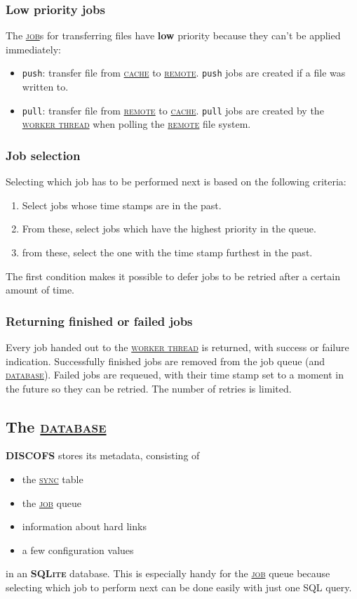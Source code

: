 \documentclass[a4paper]{article}
\newcommand{\software}[1]{\textsc{\textbf{#1}}\xspace}
\newcommand{\discofs}{\software{DISCOFS}}
\newcommand{\sqlite}{\software{SQLite}}
\newcommand{\component}[1]{\hyperref[comp:#1]{\textsc{#1}}\xspace}
\newcommand{\job}{\component{job}}
\newcommand{\jobs}{\job{}s\xspace}
\newcommand{\jobtype}[1]{\texttt{#1}\xspace}
\newcommand{\push}{\jobtype{push}}
\newcommand{\pull}{\jobtype{pull}}
\newcommand{\sync}{\component{sync}}
\newcommand{\cache}{\component{cache}}
\newcommand{\remote}{\component{remote}}
\newcommand{\database}{\component{database}}
\newcommand{\workerthread}{\hyperref[comp:workerthread]{\textsc{worker thread}}\xspace}
\begin{document}
\subsubsection{Low priority jobs}
The \jobs for transferring files have \textbf{low} priority because they can't be applied
immediately:
\begin{itemize}
	\item \push: transfer file from \cache to \remote. \push jobs are created if a
			file was written to.
	\item \pull: transfer file from \remote to \cache. \pull jobs are created by
			the \workerthread when polling the \remote file system.
\end{itemize}


\subsubsection{Job selection}
Selecting which job has to be performed next is based on the following criteria:

\begin{enumerate}
		\item Select jobs whose time stamps are in the past.
		\item From these, select jobs which have the highest priority in the queue.
		\item from these, select the one with the time stamp furthest in the past.
\end{enumerate}

The first condition makes it possible to defer jobs to be retried after a
certain amount of time.

\subsubsection{Returning finished or failed jobs}
\label{sec:job_return}
Every job handed out to the \workerthread is returned, with success or failure
indication. Successfully finished jobs are removed from the job queue (and
\database). Failed jobs are requeued, with their time stamp set to a moment in
the future so they can be retried. The number of retries is limited.

\subsection{The \database} %
\label{comp:database}
\discofs stores its metadata, consisting of
\begin{itemize}
	\item the \sync table
	\item the \job queue
	\item information about hard links
	\item a few configuration values
\end{itemize}
in an \sqlite database. This is especially handy for the \job queue because
selecting which job to perform next can be done easily with just one SQL query.
\end{document}

